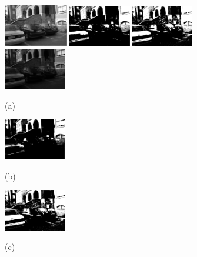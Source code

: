 \documentclass{article}
\begin{document}
\begin{figure}[htb]

\begin{minipage}[b]{.3\linewidth}
  \centering
  \centerline{\includegraphics[width=2.8cm]{./Figs/leuven1}}
\end{minipage}
\hfill
\begin{minipage}[b]{0.3\linewidth}
  \centering
  \centerline{\includegraphics[width=2.7cm]{./Figs/leuven1_otsu}}
\end{minipage}
\hfill
\begin{minipage}[b]{0.3\linewidth}
  \centering
  \centerline{\includegraphics[width=2.7cm]{./Figs/leuven1_numcc}}
\end{minipage}

\begin{minipage}[b]{.3\linewidth}
  \centering
  \centerline{\includegraphics[width=2.7cm]{./Figs/leuven4}}
   \centerline{(a)}\medskip
\end{minipage}
\hfill
\begin{minipage}[b]{0.3\linewidth}
  \centering
  \centerline{\includegraphics[width=2.7cm]{./Figs/leuven4_otsu}}
   \centerline{(b)}\medskip
\end{minipage}
\hfill
\begin{minipage}[b]{0.3\linewidth}
  \centering
  \centerline{\includegraphics[width=2.7cm]{./Figs/leuven4_numcc}}
   \centerline{(c)}\medskip
\end{minipage}


\end{figure}
\end{document}
